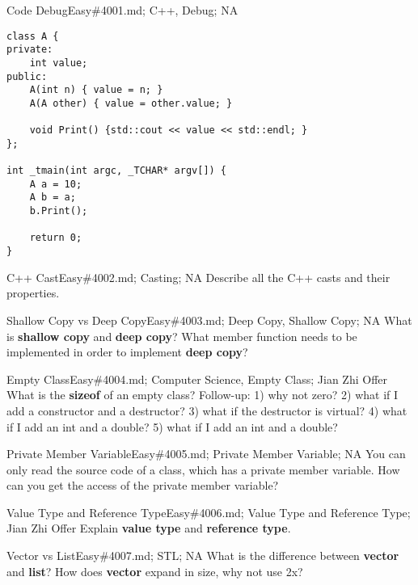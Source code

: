 \documentclass[oldfontcommands]{memoir}
\begin{document}
{\begin{question}{Code Debug}{Easy}{\#4001.md; C++, Debug; NA}
\begin{verbatim}
class A {
private:
    int value;
public:
    A(int n) { value = n; }
    A(A other) { value = other.value; }

    void Print() {std::cout << value << std::endl; }
};

int _tmain(int argc, _TCHAR* argv[]) {
    A a = 10;
    A b = a;
    b.Print();

    return 0;
}
\end{verbatim}


\end{question}

\begin{question}{C++ Cast}{Easy}{\#4002.md; Casting; NA}
Describe all the C++ casts and their properties.

\end{question}

\begin{question}{Shallow Copy vs Deep Copy}{Easy}{\#4003.md; Deep Copy, Shallow Copy; NA}
What is {\bf{shallow copy}} and {\bf{deep copy}}? What member function needs to be implemented in order to implement {\bf{deep copy}}?

\end{question}

\begin{question}{Empty Class}{Easy}{\#4004.md; Computer Science, Empty Class; Jian Zhi Offer}
What is the {\bf{sizeof}} of an empty class? Follow-up: 1) why not zero? 2) what if I add a constructor and a destructor? 3) what if the destructor is virtual? 4) what if I add an int and a double? 5) what if I add an int and a double?

\end{question}

\begin{question}{Private Member Variable}{Easy}{\#4005.md; Private Member Variable; NA}
You can only read the source code of a class, which has a private member variable. How can you get the access of the private member variable?

\end{question}

\begin{question}{Value Type and Reference Type}{Easy}{\#4006.md; Value Type and Reference Type; Jian Zhi Offer}
Explain {\bf{value type}} and {\bf{reference type}}.

\end{question}

\begin{question}{Vector vs List}{Easy}{\#4007.md; STL; NA}
What is the difference between {\bf{vector}} and {\bf{list}}? How does {\bf{vector}} expand in size, why not use 2x?


\end{question}}
\end{document}
